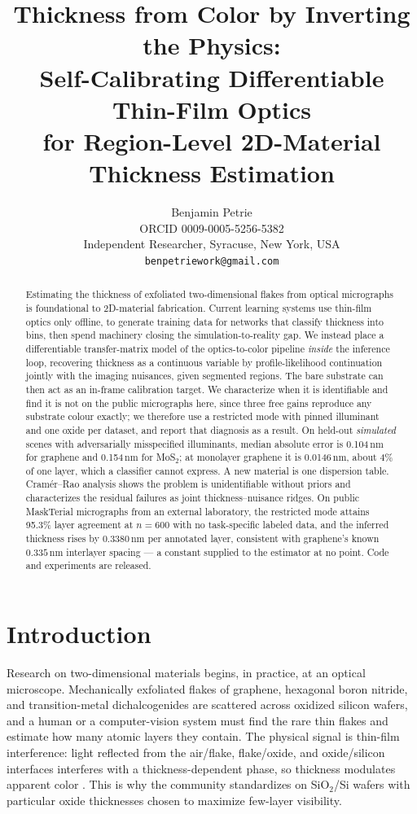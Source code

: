 \documentclass[10pt]{article}
\title{\bf Thickness from Color by Inverting the Physics:\\ Self-Calibrating Differentiable Thin-Film Optics\\ for Region-Level 2D-Material Thickness Estimation}
\author{Benjamin Petrie\\ \small ORCID 0009-0005-5256-5382\\
\small Independent Researcher, Syracuse, New York, USA\\
\small \texttt{benpetriework@gmail.com}}
\date{}
\begin{document}
\maketitle

\begin{abstract}
Estimating the thickness of exfoliated two-dimensional flakes from optical micrographs is foundational to 2D-material fabrication. Current learning systems use thin-film optics only offline, to generate training data for networks that classify thickness into bins, then spend machinery closing the simulation-to-reality gap. We instead place a differentiable transfer-matrix model of the optics-to-color pipeline \emph{inside} the inference loop, recovering thickness as a continuous variable by profile-likelihood continuation jointly with the imaging nuisances, given segmented regions. The bare substrate can then act as an in-frame calibration target. We characterize when it is identifiable and find it is not on the public micrographs here, since three free gains reproduce any substrate colour exactly; we therefore use a restricted mode with pinned illuminant and one oxide per dataset, and report that diagnosis as a result. On held-out \emph{simulated} scenes with adversarially misspecified illuminants, median absolute error is 0.104\,nm for graphene and 0.154\,nm for MoS$_2$; at monolayer graphene it is 0.0146\,nm, about 4\% of one layer, which a classifier cannot express. A new material is one dispersion table. Cram\'er--Rao analysis shows the problem is unidentifiable without priors and characterizes the residual failures as joint thickness--nuisance ridges. On public MaskTerial micrographs from an external laboratory, the restricted mode attains 95.3\% layer agreement at $n{=}600$ with no task-specific labeled data, and the inferred thickness rises by $0.3380$\,nm per annotated layer, consistent with graphene's known $0.335$\,nm interlayer spacing --- a constant supplied to the estimator at no point. Code and experiments are released.
\end{abstract}

\section{Introduction}

Research on two-dimensional materials begins, in practice, at an optical microscope. Mechanically exfoliated flakes of graphene, hexagonal boron nitride, and transition-metal dichalcogenides are scattered across oxidized silicon wafers, and a human or a computer-vision system must find the rare thin flakes and estimate how many atomic layers they contain. The physical signal is thin-film interference: light reflected from the air/flake, flake/oxide, and oxide/silicon interfaces interferes with a thickness-dependent phase, so thickness modulates apparent color \cite{blake2007,ni2007}. This is why the community standardizes on SiO$_2$/Si wafers with particular oxide thicknesses chosen to maximize few-layer visibility.
\end{document}
